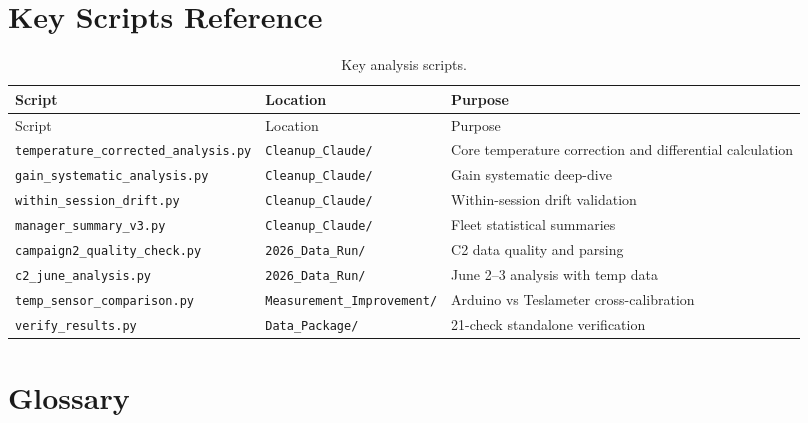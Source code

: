 \documentclass[11pt,letterpaper]{article}
\begin{document}
\appendix
\section{Key Scripts Reference}
\label{app:scripts}

\begin{longtable}{@{}lp{3.5cm}p{7cm}@{}}
\caption{Key analysis scripts.} \label{tab:scripts} \\
\toprule
Script & Location & Purpose \\
\midrule
\endfirsthead
\toprule
Script & Location & Purpose \\
\midrule
\endhead
\texttt{temperature\_corrected\_analysis.py} & \texttt{Cleanup\_Claude/} & Core temperature correction and differential calculation \\
\texttt{gain\_systematic\_analysis.py} & \texttt{Cleanup\_Claude/} & Gain systematic deep-dive \\
\texttt{within\_session\_drift.py} & \texttt{Cleanup\_Claude/} & Within-session drift validation \\
\texttt{manager\_summary\_v3.py} & \texttt{Cleanup\_Claude/} & Fleet statistical summaries \\
\texttt{campaign2\_quality\_check.py} & \texttt{2026\_Data\_Run/} & C2 data quality and parsing \\
\texttt{c2\_june\_analysis.py} & \texttt{2026\_Data\_Run/} & June 2--3 analysis with temp data \\
\texttt{temp\_sensor\_comparison.py} & \texttt{Measurement\_Improvement/} & Arduino vs Teslameter cross-calibration \\
\texttt{verify\_results.py} & \texttt{Data\_Package/} & 21-check standalone verification \\
\bottomrule
\end{longtable}


\section{Glossary}
\label{app:glossary}
\end{document}
